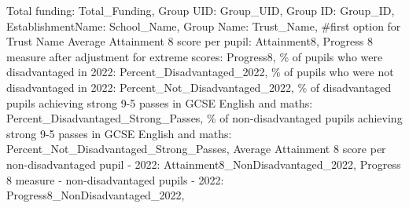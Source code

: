 \documentclass[
  letterpaper,
  DIV=11,
  numbers=noendperiod]{scrartcl}
\newenvironment{Shaded}{\begin{snugshade}}{\end{snugshade}}
\newcommand{\CommentTok}[1]{\textcolor[rgb]{0.37,0.37,0.37}{#1}}
\newcommand{\NormalTok}[1]{\textcolor[rgb]{0.00,0.23,0.31}{#1}}
\newcommand{\SpecialCharTok}[1]{\textcolor[rgb]{0.37,0.37,0.37}{#1}}
\newcommand{\StringTok}[1]{\textcolor[rgb]{0.13,0.47,0.30}{#1}}
\begin{document}
\begin{Shaded}
\begin{Highlighting}[]
    \StringTok{\textquotesingle{}Total funding\textquotesingle{}}\NormalTok{: }\StringTok{\textquotesingle{}Total\_Funding\textquotesingle{}}\NormalTok{,}
    \StringTok{\textquotesingle{}Group UID\textquotesingle{}}\NormalTok{: }\StringTok{\textquotesingle{}Group\_UID\textquotesingle{}}\NormalTok{,}
    \StringTok{\textquotesingle{}Group ID\textquotesingle{}}\NormalTok{: }\StringTok{\textquotesingle{}Group\_ID\textquotesingle{}}\NormalTok{,}
    \StringTok{\textquotesingle{}EstablishmentName\textquotesingle{}}\NormalTok{: }\StringTok{\textquotesingle{}School\_Name\textquotesingle{}}\NormalTok{,}
    \StringTok{\textquotesingle{}Group Name\textquotesingle{}}\NormalTok{: }\StringTok{\textquotesingle{}Trust\_Name\textquotesingle{}}\NormalTok{, }\CommentTok{\#first option for Trust Name}
    \StringTok{\textquotesingle{}Average Attainment 8 score per pupil\textquotesingle{}}\NormalTok{: }\StringTok{\textquotesingle{}Attainment8\textquotesingle{}}\NormalTok{,}
    \StringTok{\textquotesingle{}Progress 8 measure after adjustment for extreme scores\textquotesingle{}}\NormalTok{: }\StringTok{\textquotesingle{}Progress8\textquotesingle{}}\NormalTok{,}
    \StringTok{\textquotesingle{}}\SpecialCharTok{\% o}\StringTok{f pupils who were disadvantaged in 2022\textquotesingle{}}\NormalTok{: }\StringTok{\textquotesingle{}Percent\_Disadvantaged\_2022\textquotesingle{}}\NormalTok{,}
    \StringTok{\textquotesingle{}}\SpecialCharTok{\% o}\StringTok{f pupils who were not disadvantaged in 2022\textquotesingle{}}\NormalTok{: }\StringTok{\textquotesingle{}Percent\_Not\_Disadvantaged\_2022\textquotesingle{}}\NormalTok{,}
    \StringTok{\textquotesingle{}}\SpecialCharTok{\% o}\StringTok{f disadvantaged pupils achieving strong 9{-}5 passes in GCSE English and maths\textquotesingle{}}\NormalTok{: }\StringTok{\textquotesingle{}Percent\_Disadvantaged\_Strong\_Passes\textquotesingle{}}\NormalTok{,}
    \StringTok{\textquotesingle{}}\SpecialCharTok{\% o}\StringTok{f non{-}disadvantaged pupils achieving strong 9{-}5 passes in GCSE English and maths\textquotesingle{}}\NormalTok{: }\StringTok{\textquotesingle{}Percent\_Not\_Disadvantaged\_Strong\_Passes\textquotesingle{}}\NormalTok{,}
    \StringTok{\textquotesingle{}Average Attainment 8 score per non{-}disadvantaged pupil {-} 2022\textquotesingle{}}\NormalTok{: }\StringTok{\textquotesingle{}Attainment8\_NonDisadvantaged\_2022\textquotesingle{}}\NormalTok{,}
    \StringTok{\textquotesingle{}Progress 8 measure {-} non{-}disadvantaged pupils {-} 2022\textquotesingle{}}\NormalTok{: }\StringTok{\textquotesingle{}Progress8\_NonDisadvantaged\_2022\textquotesingle{}}\NormalTok{,}

\end{Highlighting}
\end{Shaded}
\end{document}
